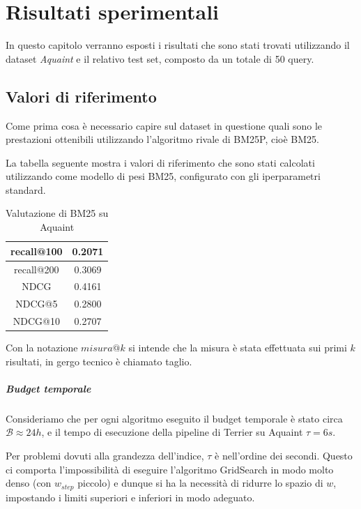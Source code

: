 \chapter{Risultati sperimentali}

In questo capitolo verranno esposti i risultati che sono stati trovati
utilizzando il dataset \textit{Aquaint} e il relativo test set, composto
da un totale di 50 query.

\section{Valori di riferimento}
Come prima cosa è necessario capire sul dataset in questione
quali sono le prestazioni ottenibili utilizzando l'algoritmo rivale di BM25P, cioè BM25.

La tabella seguente mostra i valori di riferimento che sono stati calcolati utilizzando come modello di pesi
BM25, configurato con gli iperparametri standard.

\begin{table}[h!]
	\centering
	\begin{tabular}{|c|c|}
		\hline
		recall@100 & 0.2071 \\
		\hline
		recall@200 & 0.3069 \\
		\hline
		NDCG & 0.4161 \\
		\hline
		NDCG@5 & 0.2800 \\
		\hline
		NDCG@10 & 0.2707 \\
		\hline
	\end{tabular}
\caption{Valutazione di BM25 su Aquaint}
\end{table}

Con la notazione $misura@k$ si intende che
la misura è stata effettuata sui primi $k$ risultati, in gergo tecnico
è chiamato taglio.

\paragraph{Budget temporale} Consideriamo che per ogni algoritmo
eseguito il budget temporale è stato circa $\mathcal{B} \approx 24h$,
e il tempo di esecuzione della pipeline di Terrier su Aquaint $\tau = 6s$.

Per problemi dovuti alla grandezza dell'indice, $\tau$ è nell'ordine dei secondi.
Questo ci comporta l'impossibilità di eseguire l'algoritmo GridSearch
in modo molto denso (con $w_{step}$ piccolo) e dunque si ha la necessità
di ridurre lo spazio di $w$, impostando i limiti superiori e inferiori
in modo adeguato.

